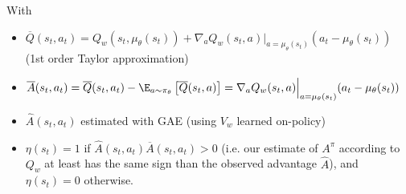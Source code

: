 With
\begin{itemize}
    \item $\overline{Q}(s_t,a_t) = Q_w(s_t, \mu_\theta(s_t)) + \nabla_a Q_w(s_t,a) \Bigr|_{a=\mu_\theta(s_t)}(a_t-\mu_\theta(s_t))$ (1st order Taylor approximation)
    \item $\overline{A}(s_t,a_t) = \overline{Q}(s_t,a_t) - \E_{a \sim \pi_\theta}\left[\overline{Q}(s_t,a)\right] = \nabla_a Q_w(s_t, a) \Bigr|_{a=\mu_\theta(s_t)} (a_t-\mu_\theta(s_t))$
    \item $\hat{A}(s_t,a_t)$ estimated with GAE (using $V_w$ learned on-policy)
    \item $\eta(s_t) = 1$ if $\hat{A}(s_t,a_t) \overline{A}(s_t,a_t) > 0$ (i.e. our estimate of $A^\pi$ according to $Q_w$ at least has the same sign than the observed advantage $\hat{A}$), and $\eta(s_t) = 0$ otherwise.
\end{itemize}